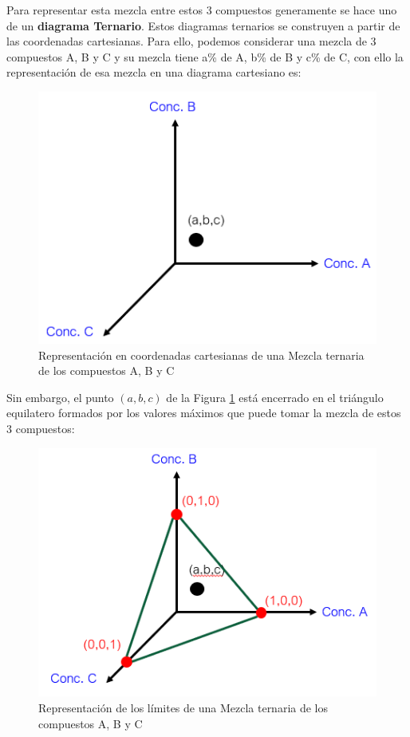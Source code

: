 \documentclass[11pt]{book}
\begin{document}
Para representar esta mezcla entre estos 3 compuestos generamente se hace uno de un \textbf{diagrama Ternario}. Estos diagramas ternarios se construyen a partir de las coordenadas cartesianas. Para ello, podemos considerar una mezcla de 3 compuestos A, B y C y su mezcla tiene a\% de A, b\% de B y c\% de C, con ello la representación de esa mezcla en una diagrama cartesiano es:

\begin{figure}[H]
    \centering
    \includegraphics{img/LiquidoLiquido/MezclaTresCompuestos.PNG}
    \caption{Representación en coordenadas cartesianas de una Mezcla ternaria de los compuestos A, B y C}
    \label{fig:MezclaTresCompuestos}
\end{figure}
 
Sin embargo, el punto $(a,b,c)$ de la Figura \ref{fig:MezclaTresCompuestos} está encerrado en el triángulo equilatero formados por los valores máximos que puede tomar la mezcla de estos 3 compuestos:

\begin{figure}[H]
    \centering
    \includegraphics{img/LiquidoLiquido/MezclaTresCompuestos_2.PNG}
    \caption{Representación de los límites de una Mezcla ternaria de los compuestos A, B y C}
    \label{fig:MezclaTresCompuestos_2}
\end{figure}
\end{document}

